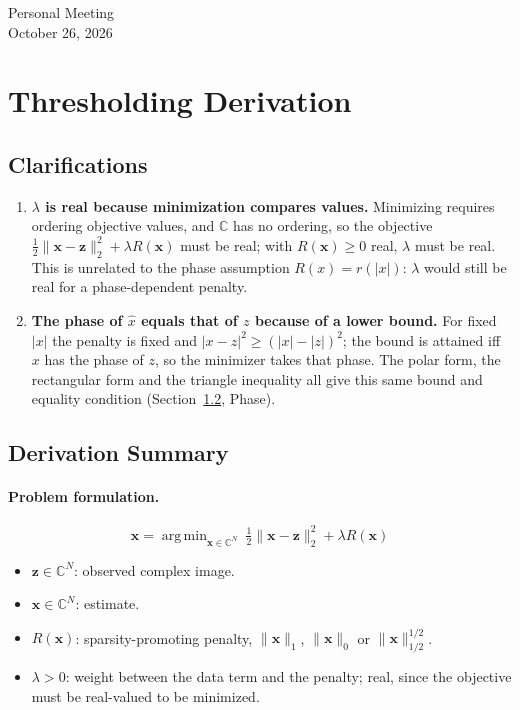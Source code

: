 \documentclass[11pt,a4paper]{article}
\theoremstyle{definition}
\newcommand{\C}{\mathbb{C}}
\DeclareMathOperator*{\argmin}{arg\,min}
\begin{document}
\begin{center}
{\LARGE Personal Meeting}\\[0.4em]
{\large October 26, 2026}
\end{center}

\section{Thresholding Derivation}

\subsection{Clarifications}
\begin{enumerate}
  \item \textbf{$\lambda$ is real because minimization compares values.}
        Minimizing requires ordering objective values, and $\C$ has no ordering, so the objective
        $\tfrac12\lVert\mathbf x-\mathbf z\rVert_2^2+\lambda R(\mathbf x)$ must be real; with $R(\mathbf x)\ge0$ real,
        $\lambda$ must be real. This is unrelated to the phase assumption $R(x)=r(|x|)$:
        $\lambda$ would still be real for a phase-dependent penalty.
  \item \textbf{The phase of $\hat x$ equals that of $z$ because of a lower bound.}
        For fixed $|x|$ the penalty is fixed and $|x-z|^2\ge(|x|-|z|)^2$; the bound is attained iff $x$ has the
        phase of $z$, so the minimizer takes that phase. The polar form, the rectangular form and the triangle
        inequality all give this same bound and equality condition (Section~\ref{sec:thr-summary}, Phase).
\end{enumerate}

\subsection{Derivation Summary}\label{sec:thr-summary}

\paragraph{Problem formulation.}
\[
  \hat{\mathbf x} = \argmin_{\mathbf x\in\C^N}\ \tfrac12\lVert \mathbf x - \mathbf z\rVert_2^2 + \lambda R(\mathbf x)
\]
\begin{itemize}
  \item $\mathbf z\in\C^N$: observed complex image.
  \item $\mathbf x\in\C^N$: estimate.
  \item $R(\mathbf x)$: sparsity-promoting penalty, $\lVert\mathbf x\rVert_1$, $\lVert\mathbf x\rVert_0$ or $\lVert\mathbf x\rVert_{1/2}^{1/2}$.
  \item $\lambda>0$: weight between the data term and the penalty; real, since the objective must be
        real-valued to be minimized.
\end{itemize}
\end{document}
